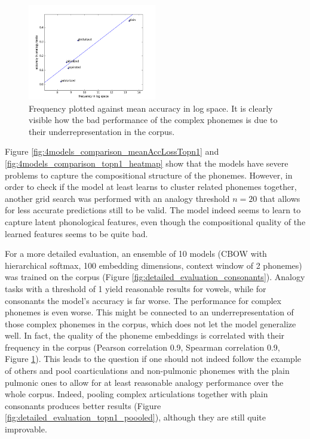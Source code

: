 \documentclass[11pt]{article}
\begin{document}
\begin{figure}[h!] %
   \centering
   \includegraphics[width=0.5\textwidth]{freq_acc_correlation_logspace_topn1} 
   \caption{Frequency plotted against mean accuracy in log space. It is clearly visible how the bad performance of the complex phonemes is due to their underrepresentation in the corpus.}
   \label{fig:freq_acc_correlation_logspace_topn1}
\end{figure}




Figure \ref{fig:4models_comparison_meanAccLossTopn1} and \ref{fig:4models_comparison_topn1_heatmap}  show that the models have severe problems to capture the compositional structure of the phonemes. However, in order to check if the model at least learns to cluster related phonemes together, another grid search was performed with an analogy threshold $n = 20$ that allows for less accurate predictions still to be valid. The model indeed seems to learn to capture latent phonological features, even though the compositional quality of the learned features seems to be quite bad. 

For a more detailed evaluation, an ensemble of 10 models (CBOW with hierarchical softmax, 100 embedding dimensions, context window of 2 phonemes) was trained on the corpus (Figure \ref{fig:detailed_evaluation_consonants}). Analogy tasks with a threshold of 1 yield reasonable results for vowels, while for consonants the model's accuracy is far worse. The performance for complex phonemes is even worse. This might be connected to an underrepresentation of those complex phonemes in the corpus, which does not let the model generalize well.
In fact, the quality of the phoneme embeddings is correlated with their frequency in the corpus (Pearson correlation 0.9, Spearman correlation 0.9, Figure \ref{fig:freq_acc_correlation_logspace_topn1}). This leads to the question if one should not indeed follow the example of others \cite{rama2016siamese,jager2014phylogenetic} and pool coarticulations and non-pulmonic phonemes with the plain pulmonic ones to allow for at least reasonable analogy performance over the whole corpus. Indeed, pooling complex articulations together with plain consonants produces better results (Figure \ref{fig:detailed_evaluation_topn1_poooled}), although they are still quite improvable. 
\end{document}
